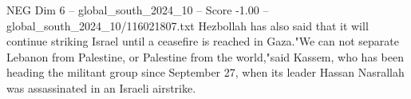 \begin{textsample}{NEG Dim 6 – global\_south\_2024\_10 – Score -1.00 – global\_south\_2024\_10/116021807.txt}
Hezbollah has also said that it will continue striking Israel until a ceasefire is reached in Gaza."We can not separate Lebanon from Palestine, or Palestine from the world,"said Kassem, who has been heading the militant group since September 27, when its leader Hassan Nasrallah was assassinated in an Israeli airstrike.

\end{textsample}
